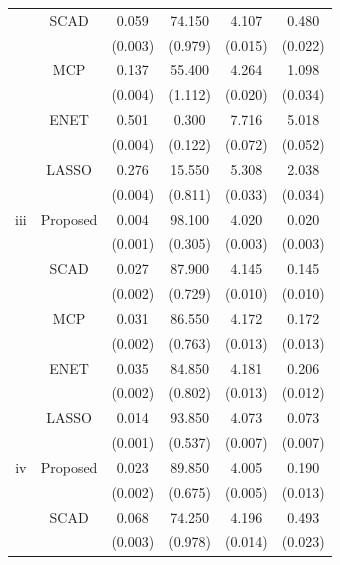 \begin{table}[h]
\begin{tabular}{c|ccccc}
           & SCAD                           & 0.059& 74.150  & 4.107   & 0.480  \\
           &                        & (0.003)  & (0.979)  & (0.015)   & (0.022) \\
           & MCP                            & 0.137  & 55.400  & 4.264   & 1.098  \\
           &                        & (0.004)  &  (1.112)  &(0.020)   &  (0.034) \\
           & ENET                           & 0.501   & 0.300   & 7.716  & 5.018  \\
           &                        & (0.004)  &  (0.122)   & (0.072)   &  (0.052) \\
           & LASSO                          & 0.276  & 15.550 & 5.308  & 2.038  \\
           &                          & (0.004)  & (0.811)  & (0.033)   & (0.034) \\
             \hline
  iii         & Proposed & 0.004  & 98.100 & 4.020 & 0.020 \\
          &  &(0.001)   & (0.305)  & (0.003)    & (0.003) \\
           & SCAD                           & 0.027 & 87.900& 4.145   & 0.145\\
           &                           & (0.002)  & (0.729)  &(0.010)   & (0.010) \\
           & MCP                            & 0.031  & 86.550 & 4.172  & 0.172\\
           &                            & (0.002)  & (0.763)  & (0.013)   & (0.013) \\
           & ENET                           & 0.035 & 84.850& 4.181 & 0.206\\
           &                           & (0.002)  & (0.802)  & (0.013)   & (0.012) \\
           & LASSO                          & 0.014 & 93.850 & 4.073 & 0.073\\
           &                          &(0.001)  &(0.537)  &(0.007)   &(0.007) \\
             \hline
   iv      & Proposed & 0.023  & 89.850& 4.005& 0.190 \\
         & & (0.002)   & (0.675)  & (0.005) &(0.013) \\
           & SCAD                           & 0.068 & 74.250& 4.196 & 0.493\\
           &                            & (0.003)  & (0.978)  & (0.014)   & (0.023) \\

\end{tabular}
\end{table}
